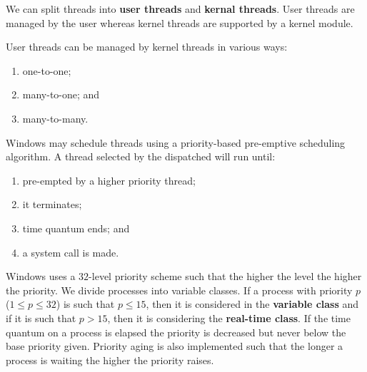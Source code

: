 We can split threads into \textbf{user threads} and \textbf{kernal threads}. User threads are managed by the user whereas kernel threads are supported by a kernel module.

User threads can be managed by kernel threads in various ways:
\begin{enumerate}
    \item one-to-one;
    \item many-to-one; and
    \item many-to-many.
\end{enumerate}

\begin{example}
    Windows may schedule threads using a priority-based pre-emptive scheduling algorithm. A thread selected by the dispatched will run until:
    \begin{enumerate}
        \item pre-empted by a higher priority thread;
        \item it terminates;
        \item time quantum ends; and
        \item a system call is made.
    \end{enumerate}
    Windows uses a $32$-level priority scheme such that the higher the level the higher the priority. We divide processes into variable classes. If a process with priority $p$ ($1 \leq p \leq 32$) is such that $p \leq 15$, then it is considered in the \textbf{variable class} and if it is such that $p > 15$, then it is considering the \textbf{real-time class}. If the time quantum on a process is elapsed the priority is decreased but never below the base priority given. Priority aging is also implemented such that the longer a process is waiting the higher the priority raises.
\end{example}
